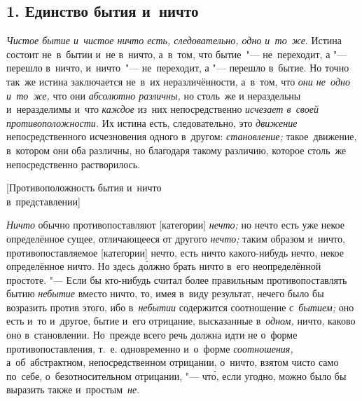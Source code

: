 
\subsection[1. Единство бытия и~ничто]{1. Единство бытия и~ничто}

{\em Чистое бытие и~чистое ничто есть, следовательно, одно и~то~же}. Истина
состоит не~в~бытии и~не в~ничто, а~в~том, что бытие~"--- не~переходит, а "---
перешло в~ничто, и~ничто~"--- не~переходит, а "--- перешло в~бытие. Но точно
так~же истина заключается не~в~их неразличённости, а~в~том, что
{\em они не~одно и~то~же,} что они {\em абсолютно различны,} но столь~же и
нераздельны и~неразделимы и~что {\em каждое} из~них непосредственно
{\em исчезает в~своей противоположности.} Их истина есть, следовательно, это
{\em движение} непосредственного исчезновения одного в~другом:
{\em становление;} такое~движение, в~котором они оба различны,
но благодаря такому различию, которое столь~же непосредственно растворилось.

%
{[Противоположность бытия и~ничто\nopagebreak\\в~представлении]}

{\em Ничто} обычно противопоставляют [категории] {\em нечто;} но нечто есть
уже некое определённое сущее, отличающееся от другого {\em нечто;} таким образом
и~ничто, противопоставляемое [категории] нечто, есть ничто какого-нибудь нечто,
некое определённое ничто. Но здесь д\'{о}лжно брать ничто в~его неопределённой
простоте. "--- Если бы кто-нибудь считал более правильным противопоставлять бытию
{\em небытие} вместо ничто, то, имея в~виду результат, нечего было бы возразить
против этого, ибо в~{\em небытии} содержится соотношение с~{\em бытием;} оно
есть и~то и~другое, бытие и~его отрицание, высказанные в~{\em одном,} ничто,
каково оно в~становлении. Но~прежде всего речь должна идти не о~форме
противопоставления, т.~е. одновременно и~о~форме {\em соотношения,}
а~об~абстрактном, непосредственном отрицании, о~ничто, взятом чисто само
по~себе, о~безотносительном отрицании, "--- чт\'{о}, если угодно, можно было бы
выразить также и~простым~{\em не}.

